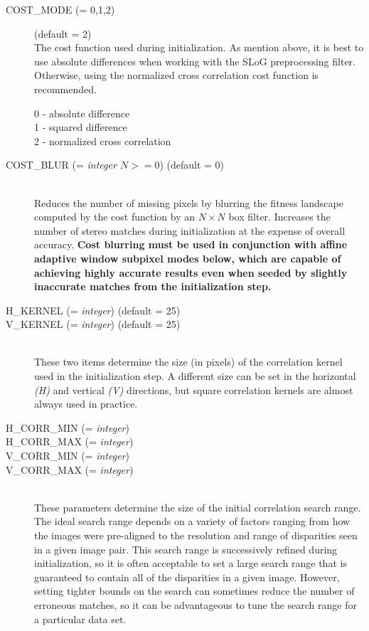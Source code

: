 \begin{description}

\item[COST\_MODE \textnormal{\small{(= 0,1,2)}}] (default = 2) \hfill \\
  The cost function used during initialization. As mention above,
  it is best to use absolute differences when working with the SLoG
  preprocessing filter. Otherwise, using the normalized cross
  correlation cost function is recommended.

  \begin{description}
    \item[0 - absolute difference]
    \item[1 - squared difference]
    \item[2 - normalized cross correlation]
  \end{description}

\item[COST\_BLUR \textnormal{\small{(= \emph{integer $N >= 0$})}} (default = 0)] \hfill \\
  Reduces the number of missing pixels by blurring the fitness
  landscape computed by the cost function by an $N \times N$ box filter.
  Increases the number of stereo matches during initialization at the
  expense of overall accuracy.  {\bf Cost blurring must be used in
    conjunction with affine adaptive window subpixel modes below,
    which are capable of achieving highly accurate results even when
    seeded by slightly inaccurate matches from the initialization
    step.}

\item[H\_KERNEL \textnormal{\small{(= \emph{integer})}} (default = 25)]
\item[V\_KERNEL \textnormal{\small{(= \emph{integer})}} (default = 25)] \hfill \\
  These two items determine the size (in pixels) of the correlation
  kernel used in the initialization step.  A different size can be set
  in the horizontal \emph{(H)} and vertical \emph{(V)} directions, but
  square correlation kernels are almost always used in practice.

\item[H\_CORR\_MIN \textnormal{\small{(= \emph{integer})}}]
\item[H\_CORR\_MAX \textnormal{\small{(= \emph{integer})}}]
\item[V\_CORR\_MIN \textnormal{\small{(= \emph{integer})}}]
\item[V\_CORR\_MAX \textnormal{\small{(= \emph{integer})}}] \hfill \\
  These parameters determine the size of the initial correlation
  search range.  The ideal search range depends on a variety of
  factors ranging from how the images were pre-aligned to the
  resolution and range of disparities seen in a given image pair.
  This search range is successively refined during initialization, so
  it is often acceptable to set a large search range that is guaranteed
  to contain all of the disparities in a given image.  However,
  setting tighter bounds on the search can sometimes reduce the number
  of erroneous matches, so it can be advantageous to tune the
  search range for a particular data set.


\end{description}
